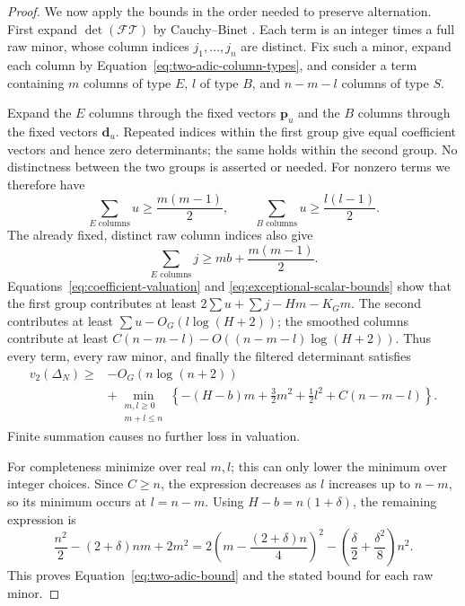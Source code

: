 \begin{proof}
We now apply the bounds in the order needed to preserve alternation.
First expand $\det(\mathcal F\mathcal T)$ by Cauchy--Binet \cite{Binet1813,Cauchy1815}.
Each term is an integer times a full raw minor, whose column indices
$j_1,\ldots,j_n$ are distinct. Fix such a minor, expand each column
by Equation~\eqref{eq:two-adic-column-types}, and consider a term
containing $m$ columns of type $E$, $l$ of type $B$, and $n-m-l$
columns of type $S$.

Expand the $E$ columns through the fixed vectors $\mathbf p_u$ and
the $B$ columns through the fixed vectors $\mathbf d_u$.
Repeated indices within the first group give equal coefficient vectors
and hence zero determinants; the same holds within the second group.
No distinctness between the two groups is asserted or needed.
For nonzero terms we therefore have
\[
\sum_{E\text{ columns}}u\ge\frac{m(m-1)}2,\qquad
\sum_{B\text{ columns}}u\ge\frac{l(l-1)}2.
\]
The already fixed, distinct raw column indices also give
\[
\sum_{E\text{ columns}}j\ge mb+\frac{m(m-1)}2.
\]
Equations~\eqref{eq:coefficient-valuation} and
\eqref{eq:exceptional-scalar-bounds} show that the first group contributes
at least $2\sum u+\sum j-Hm-K_Gm$.
The second contributes at least $\sum u-O_G(l\log(H+2))$;
the smoothed columns contribute at least
$C(n-m-l)-O((n-m-l)\log(H+2))$.
Thus every term, every raw minor, and finally the filtered determinant
satisfies
\begin{equation}\label{eq:two-adic-quadratic}
\begin{split}
v_2(\Delta_N)\ge{}&-O_G(n\log(n+2))\\
&+\min_{\substack{m,l\ge0\\m+l\le n}}
\left\{-(H-b)m+\frac32m^2+\frac12l^2+C(n-m-l)\right\}.
\end{split}
\end{equation}
Finite summation causes no further loss in valuation.

For completeness minimize over real $m,l$; this can only lower the
minimum over integer choices. Since $C\ge n$, the expression decreases
as $l$ increases up to $n-m$, so its minimum occurs at $l=n-m$.
Using $H-b=n(1+\delta)$, the remaining expression is
\[
\frac{n^2}{2}-(2+\delta)nm+2m^2
=2\left(m-\frac{(2+\delta)n}{4}\right)^2
 -\left(\frac\delta2+\frac{\delta^2}{8}\right)n^2.
\]
This proves Equation~\eqref{eq:two-adic-bound} and the stated
bound for each raw minor.
\end{proof}
